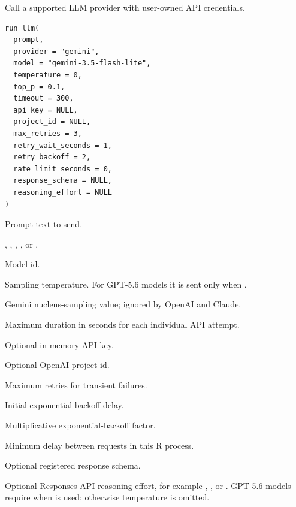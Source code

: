 \documentclass[a4paper]{book}
\begin{document}
%
\begin{Description}
Call a supported LLM provider with user-owned API credentials.
\end{Description}
%
\begin{Usage}
\begin{verbatim}
run_llm(
  prompt,
  provider = "gemini",
  model = "gemini-3.5-flash-lite",
  temperature = 0,
  top_p = 0.1,
  timeout = 300,
  api_key = NULL,
  project_id = NULL,
  max_retries = 3,
  retry_wait_seconds = 1,
  retry_backoff = 2,
  rate_limit_seconds = 0,
  response_schema = NULL,
  reasoning_effort = NULL
)
\end{verbatim}
\end{Usage}
%
\begin{Arguments}
\begin{ldescription}
\item[\code{prompt}] Prompt text to send.

\item[\code{provider}] , , , , or .

\item[\code{model}] Model id.

\item[\code{temperature}] Sampling temperature. For GPT-5.6 models it is sent only
when .

\item[\code{top\_p}] Gemini nucleus-sampling value; ignored by OpenAI and Claude.

\item[\code{timeout}] Maximum duration in seconds for each individual API attempt.

\item[\code{api\_key}] Optional in-memory API key.

\item[\code{project\_id}] Optional OpenAI project id.

\item[\code{max\_retries}] Maximum retries for transient failures.

\item[\code{retry\_wait\_seconds}] Initial exponential-backoff delay.

\item[\code{retry\_backoff}] Multiplicative exponential-backoff factor.

\item[\code{rate\_limit\_seconds}] Minimum delay between requests in this R process.

\item[\code{response\_schema}] Optional registered response schema.

\item[\code{reasoning\_effort}] Optional Responses API reasoning effort, for example
, , or . GPT-5.6 models require
 when  is used; otherwise temperature is omitted.
\end{ldescription}
\end{Arguments}
\end{document}
